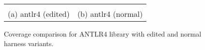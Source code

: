 \begin{figure}[t]
    \centering
    \begin{tabular}{cc}
         &
         \\
        (a) antlr4 (edited) & (b) antlr4 (normal)
    \end{tabular}
    \caption{Coverage comparison for ANTLR4 library with edited and normal harness variants.}
    \label{fig:antlr4-coverage}
\end{figure}
